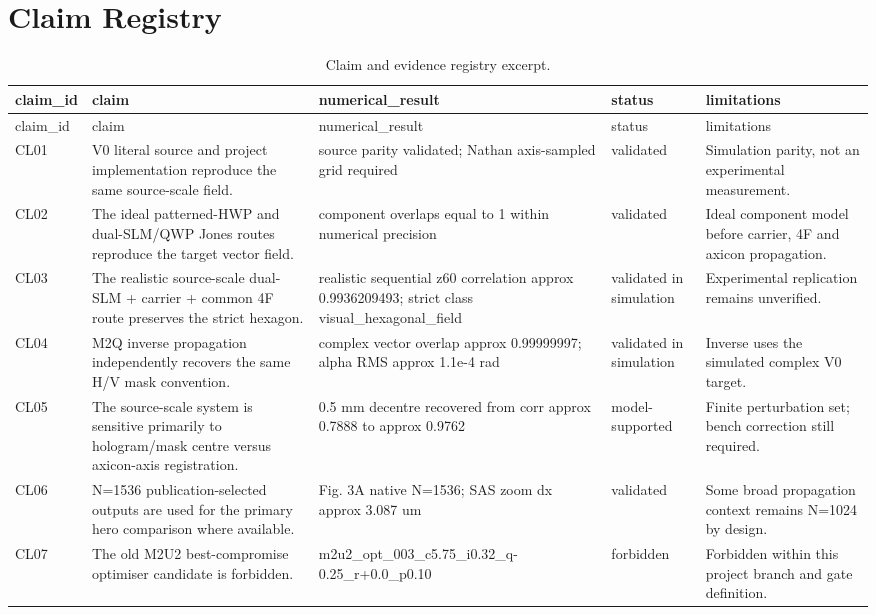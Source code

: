 \documentclass[11pt,a4paper]{report}
\begin{document}
\chapter{Claim Registry}

\begin{longtable}{p{}p{}p{}p{}p{}}
\caption{Claim and evidence registry excerpt.}\label{tab:claim-registry}\\
\toprule
claim\_id & claim & numerical\_result & status & limitations\\
\midrule
\endfirsthead
\toprule
claim\_id & claim & numerical\_result & status & limitations\\
\midrule
\endhead
CL01 & V0 literal source and project implementation reproduce the same source-scale field. & source parity validated; Nathan axis-sampled grid required & validated & Simulation parity, not an experimental measurement.\\
CL02 & The ideal patterned-HWP and dual-SLM/QWP Jones routes reproduce the target vector field. & component overlaps equal to 1 within numerical precision & validated & Ideal component model before carrier, 4F and axicon propagation.\\
CL03 & The realistic source-scale dual-SLM + carrier + common 4F route preserves the strict hexagon. & realistic sequential z60 correlation approx 0.9936209493; strict class visual\_hexagonal\_field & validated in simulation & Experimental replication remains unverified.\\
CL04 & M2Q inverse propagation independently recovers the same H/V mask convention. & complex vector overlap approx 0.99999997; alpha RMS approx 1.1e-4 rad & validated in simulation & Inverse uses the simulated complex V0 target.\\
CL05 & The source-scale system is sensitive primarily to hologram/mask centre versus axicon-axis registration. & 0.5 mm decentre recovered from corr approx 0.7888 to approx 0.9762 & model-supported & Finite perturbation set; bench correction still required.\\
CL06 & N=1536 publication-selected outputs are used for the primary hero comparison where available. & Fig. 3A native N=1536; SAS zoom dx approx 3.087 um & validated & Some broad propagation context remains N=1024 by design.\\
CL07 & The old M2U2 best-compromise optimiser candidate is forbidden. & m2u2\_opt\_003\_c5.75\_i0.32\_q-0.25\_r+0.0\_p0.10 & forbidden & Forbidden within this project branch and gate definition.\\

\end{longtable}
\end{document}
